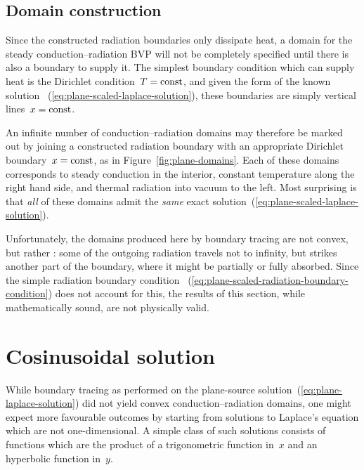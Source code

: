\begin{figure}
\end{figure}

\subsection{Domain construction}
\label{sec:cartesian.plane.domain}

Since the constructed radiation boundaries only dissipate heat,
a domain for the steady conduction--radiation BVP
will not be completely specified
until there is also a boundary to supply it.
The simplest boundary condition which can supply heat
is the Dirichlet condition~$T = \mathrm{const}$,
and given the form of the known solution~%
  (\ref{eq:plane-scaled-laplace-solution}),
these boundaries are simply vertical lines~$x = \mathrm{const}$.

An infinite number of conduction--radiation domains
may therefore be marked out
by joining a constructed radiation boundary
with an appropriate Dirichlet boundary~$x = \mathrm{const}$,
as in Figure~\ref{fig:plane-domains}.
Each of these domains corresponds to steady conduction in the interior,
constant temperature along the right hand side,
and thermal radiation into vacuum to the left.
Most surprising is that \emph{all} of these domains
admit the \emph{same} exact solution~(\ref{eq:plane-scaled-laplace-solution}).

Unfortunately,
the domains produced here by boundary tracing are not convex,
but rather :
some of the outgoing radiation travels not to infinity,
but strikes another part of the boundary,
where it might be partially or fully absorbed.
Since the simple radiation boundary condition~%
  (\ref{eq:plane-scaled-radiation-boundary-condition})
does not account for this,
the results of this section,
while mathematically sound,
are not physically valid.

\section{Cosinusoidal solution}
\label{sec:cartesian.cosine}

While boundary tracing as performed on
the plane-source solution~(\ref{eq:plane-laplace-solution})
did not yield convex conduction--radiation domains,
one might expect more favourable outcomes
by starting from solutions to Laplace's equation
which are not one-dimensional.
A simple class of such solutions consists of functions which are the product
of a trigonometric function in~$x$ and an hyperbolic function in~$y$.

